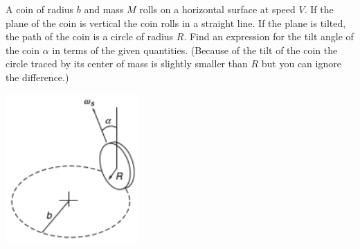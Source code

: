 \documentclass[12pt,letterpaper]{hmcpset}
\begin{document}
\begin{problem}
    A coin of radius $b$ and mass $M$ rolls on a
    horizontal surface at speed $V$. If the plane of
    the coin is vertical the coin rolls in a straight
    line. If the plane is tilted, the path of the coin
    is a circle of radius $R$. Find an expression for
    the tilt angle of the coin $\alpha$ in terms of
    the given quantities. (Because of the tilt of the
    coin the circle traced by its center of mass is
    slightly smaller than $R$ but you can ignore the
    difference.)

    \begin{center}
        \includegraphics[width=2in]{img/8_6}
    \end{center}
\end{problem}
\begin{solution}
    \vfill
\end{solution}
\clearpage
\end{document}
